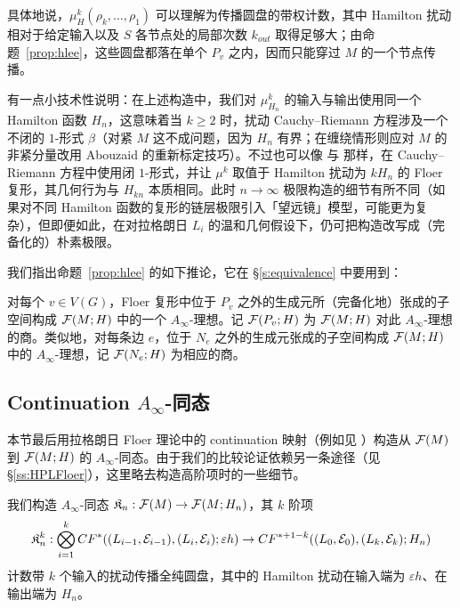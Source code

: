 具体地说，$\mu^k_H(\rho_k,\dots,\rho_1)$ 可以理解为传播圆盘的带权计数，其中 Hamilton 扰动相对于给定输入以及 $S$ 各节点处的局部次数 $k_{out}$ 取得足够大；由命题~\ref{prop:hlee}，这些圆盘都落在单个 $P_v$ 之内，因而只能穿过 $M$ 的一个节点传播。

有一点小技术性说明：在上述构造中，我们对 $\mu^k_{H_n}$ 的输入与输出使用同一个 Hamilton 函数 $H_n$，这意味着当 $k\geq 2$ 时，扰动 Cauchy--Riemann 方程涉及一个不闭的 $1$-形式 $\beta$（对紧 $M$ 这不成问题，因为 $H_n$ 有界；在缠绕情形则应对 $M$ 的非紧分量改用 Abouzaid 的重新标定技巧）。不过也可以像 \cite{Lee} 与 \cite{AuSm} 那样，在 Cauchy--Riemann 方程中使用闭 $1$-形式，并让 $\mu^k$ 取值于 Hamilton 扰动为 $kH_n$ 的 Floer 复形，其几何行为与 $H_{kn}$ 本质相同。此时 $n\to\infty$ 极限构造的细节有所不同（如果对不同 Hamilton 函数的复形的链层极限引入「望远镜」模型，可能更为复杂），但即便如此，在对拉格朗日 $L_i$ 的温和几何假设下，仍可把构造改写成（完备化的）朴素极限。

我们指出命题~\ref{prop:hlee} 的如下推论，它在 §\ref{s:equivalence} 中要用到：

\begin{prop}\label{prop:ainfty_ideal}
对每个 $v\in V(G)$，Floer 复形中位于 $P_v$ 之外的生成元所（完备化地）张成的子空间构成 $\mathcal{F}(M;H)$ 中的一个 $A_\infty$-理想。记 $\mathcal{F}(P_v;H)$ 为 $\mathcal{F}(M;H)$ 对此 $A_\infty$-理想的商。类似地，对每条边 $e$，位于 $N_e$ 之外的生成元张成的子空间构成 $\mathcal{F}(M;H)$ 中的 $A_\infty$-理想，记 $\mathcal{F}(N_e;H)$ 为相应的商。
\end{prop}

\subsection{Continuation $A_\infty$-同态}\label{ss:continuation}

本节最后用拉格朗日 Floer 理论中的 continuation 映射（例如见 \cite{SeBook}）构造从 $\mathcal{F}(M)$ 到 $\mathcal{F}(M;H)$ 的 $A_\infty$-同态。由于我们的比较论证依赖另一条途径（见 §\ref{ss:HPLFloer}），这里略去构造高阶项时的一些细节。

我们构造 $A_\infty$-同态 $\mathfrak{K}_n:\mathcal{F}(M)\to \mathcal{F}(M;H_n)$，其 $k$ 阶项
\[
\mathfrak{K}_n^k:\bigotimes_{i=1}^k CF^*((L_{i-1},\mathcal{E}_{i-1}),(L_i,\mathcal{E}_i);\varepsilon h)\to
CF^{*+1-k}((L_0,\mathcal{E}_0),(L_k,\mathcal{E}_k);H_n)
\]
计数带 $k$ 个输入的扰动传播全纯圆盘，其中的 Hamilton 扰动在输入端为 $\varepsilon h$、在输出端为 $H_n$。

